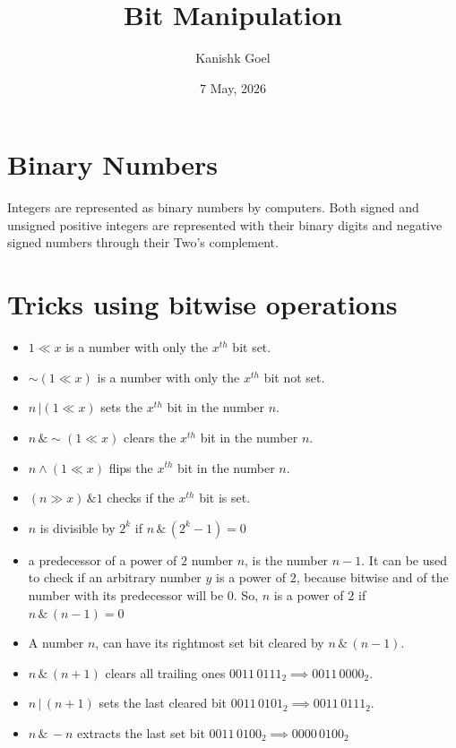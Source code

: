 \documentclass{article}
\title{Bit Manipulation}
\author{Kanishk Goel}
\date{7 May, 2026}
\begin{document}
	\SetAlgoCaptionSeparator{}
	\renewcommand{\thealgocf}{} 
	\renewcommand{\AlCapNameFnt}{\bfseries}
	\renewcommand{\AlCapFnt}{}
	\DontPrintSemicolon
	\renewcommand{\algorithmcfname}{}
	\maketitle
	\SetAlgoNoEnd
	\section{Binary Numbers}
	Integers are represented as binary numbers by computers. Both signed and unsigned positive integers are represented with their binary digits and negative signed numbers through their Two's complement.
	\section{Tricks using bitwise operations}
	\begin{itemize}
		\item $1 \ll x$ is a number with only the $x^{th}$ bit set.
		\item $\sim (1 \ll x)$ is a number with only the $x^{th}$ bit not set.
		\item $n \, | (1 \ll x)$ sets the $x^{th}$ bit in the number $n$.
		\item $n \, \& \sim (1 \ll x)$ clears the $x^{th}$ bit in the number $n$.
		\item $n \land (1 \ll x)$ flips the $x^{th}$ bit in the number $n$.
		\item $(n \gg x) \, \& 1$ checks if the $x^{th}$ bit is set.
		\item $n$ is divisible by $2^k$ if $n \, \& \, (2^k - 1) = 0$
		\item a predecessor of a power of $2$ number $n$, is the number $n-1$. It can be used to check if an arbitrary number $y$ is a power of $2$, because bitwise and of the number with its predecessor will be $0$. So, $n$ is a power of $2$ if $n \, \& \, (n-1) = 0$
		\item A number $n$, can have its rightmost set bit cleared by $n \, \& \, (n-1)$.
		\item $n \, \& \, (n+1)$ clears all trailing ones $0011 \, 0111_2 \implies 0011 \, 0000_2$.
		\item $n \, | \, (n+1)$ sets the last cleared bit $0011 \, 0101_2 \implies 0011 \, 0111_2$.
		\item $n \, \& \, -n$ extracts the last set bit $ 0011 \, 0100_2 \implies 0000 \, 0100_2 $
	\end{itemize}
\end{document}
